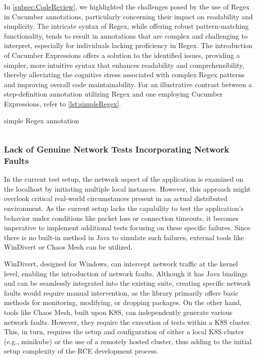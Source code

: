 In \cref{subsec:CodeReview}, we highlighted the challenges posed by the use of \ac{Regex} in Cucumber annotations, particularly concerning their impact on readability and simplicity. The intricate syntax of \ac{Regex}, while offering robust pattern-matching functionality, tends to result in annotations that are complex and challenging to interpret, especially for individuals lacking proficiency in \ac{Regex}. The introduction of Cucumber Expressions offers a solution to the identified issues, providing a simpler, more intuitive syntax that enhances readability and comprehensibility, thereby alleviating the cognitive stress associated with complex \ac{Regex} patterns and improving overall code maintainability. For an illustrative contrast between a step-definition annotation utilizing \ac{Regex} and one employing Cucumber Expressions, refer to \cref{lst:simpleRegex}.

\begin{listing}[!ht]
\caption{simple \ac{Regex} annotation}
\label{lst:simpleRegex}
\inputminted{java}{files/code/simpleRegex.java}
\end{listing}




\subsubsection{Lack of Genuine Network Tests Incorporating Network Faults}
\label{sub:lack-network-tests}

In the current test setup, the network aspect of the application is examined on the localhost by initiating multiple local instances. However, this approach might overlook critical real-world circumstances present in an actual distributed environment. As the current setup lacks the capability to test the application's behavior under conditions like packet loss or connection timeouts, it becomes imperative to implement additional tests focusing on these specific failures. Since there is no built-in method in Java to simulate such failures, external tools like WinDivert or Chaos Mesh can be utilized.

WinDivert, designed for Windows, can intercept network traffic at the kernel level, enabling the introduction of network faults. Although it has Java bindings and can be seamlessly integrated into the existing suite, creating specific network faults would require manual intervention, as the library primarily offers basic methods for monitoring, modifying, or dropping packages. On the other hand, tools like Chaos Mesh, built upon \ac{K8S}, can independently generate various network faults. However, they require the execution of tests within a \ac{K8S} cluster. This, in turn, requires the setup and configuration of either a local \ac{K8S} cluster (e.g., minikube) or the use of a remotely hosted cluster, thus adding to the initial setup complexity of the \ac{RCE} development process.
